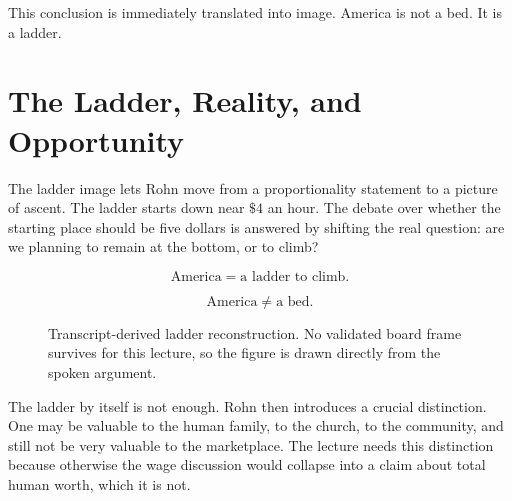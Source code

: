 This conclusion is immediately translated into image. America is not a bed. It is a ladder.

\section{The Ladder, Reality, and Opportunity}

The ladder image lets Rohn move from a proportionality statement to a picture of ascent. The ladder starts down near \(\$4\) an hour. The debate over whether the starting place should be five dollars is answered by shifting the real question: are we planning to remain at the bottom, or to climb?

\begin{equation}
\text{America}=\text{a ladder to climb}.
\end{equation}

\begin{equation}
\text{America} \neq \text{a bed}.
\end{equation}

\begin{figure}[h]
\centering
{}
\caption{Transcript-derived ladder reconstruction. No validated board frame survives for this lecture, so the figure is drawn directly from the spoken argument.}
\end{figure}

The ladder by itself is not enough. Rohn then introduces a crucial distinction. One may be valuable to the human family, to the church, to the community, and still not be very valuable to the marketplace. The lecture needs this distinction because otherwise the wage discussion would collapse into a claim about total human worth, which it is not.

